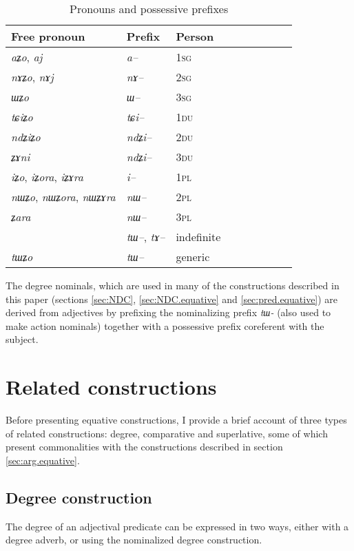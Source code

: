 \documentclass[oneside,a4paper,12pt]{article}
\newcommand{\ipa}[1]{{\phon\textit{#1}}}
\begin{document}
\begin{table}[H] \centering
\caption{Pronouns and possessive prefixes }\label{tab:pronoun}
\begin{tabular}{lllllllll} 
\toprule
 Free pronoun & Prefix & Person\\
\midrule
 \ipa{aʑo},    \ipa{aj} &	\ipa{a--}  &		1\textsc{sg} \\
\ipa{nɤʑo},  \ipa{nɤj} &	\ipa{nɤ--}  &			2\textsc{sg}\\
\ipa{ɯʑo}  &	\ipa{ɯ--}  &			3\textsc{sg}\\
\midrule
\ipa{tɕiʑo}  &	\ipa{tɕi--}  &			1\textsc{du} \\
\ipa{ndʑiʑo}  &	\ipa{ndʑi--}  &		2\textsc{du} \\	
\ipa{ʑɤni}  &	\ipa{ndʑi--}  &		3\textsc{du} \\	
\midrule
\ipa{iʑo}, \ipa{iʑora},   \ipa{iʑɤra}   &	\ipa{i--}  &			1\textsc{pl} \\
\ipa{nɯʑo}, \ipa{nɯʑora},   \ipa{nɯʑɤra}  &	\ipa{nɯ--}  &			2\textsc{pl} \\
\ipa{ʑara}  &	\ipa{nɯ--}  &			3\textsc{pl} \\
\midrule
&  \ipa{tɯ--},  \ipa{tɤ--} & indefinite \\
\ipa{tɯʑo} & \ipa{tɯ--}   &  generic\\
\bottomrule
\end{tabular}
\end{table}

The degree nominals, which are used in many of the constructions described in this paper (sections \ref{sec:NDC}, \ref{sec:NDC.equative} and \ref{sec:pred.equative}) are derived from adjectives by prefixing the nominalizing prefix \ipa{tɯ-} (also used to make action nominals) together with a possessive prefix coreferent with the subject.

\section{Related constructions}
Before presenting equative constructions, I provide a brief account of three types of related constructions: degree, comparative and superlative, some of which present commonalities with the constructions described in section \ref{sec:arg.equative}.
 
\subsection{Degree construction}
The degree of an adjectival predicate can be expressed in two ways, either with a degree adverb, or using the nominalized degree construction.
\end{document}
